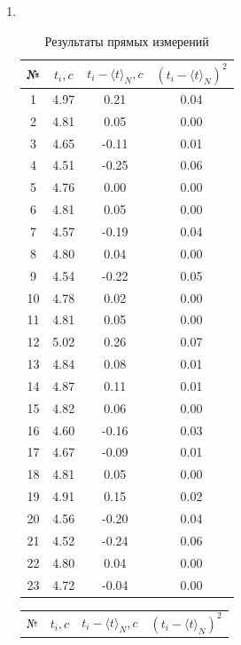 \documentclass[11pt]{article}
\newcommand{\innp}[1]{\langle #1\rangle}
\begin{document}
\begin{enumerate}
	\item ~
		\begin{table}[htb]
		\large
		\centering
		\caption{Результаты прямых измерений}
		\begin{tabular}{|c|c|c|c|}
			\hline
			№ & $t_i, c$ & $t_i - \innp{t}_N, c$ & $(t_i - \innp{t}_N)^2$\\
			\hline
			1 &4.97 & 0.21 & 0.04\\
			\hline
			2 &4.81 & 0.05 & 0.00\\
			\hline
			3 &4.65 & -0.11 & 0.01\\
			\hline
			4 &4.51 & -0.25 & 0.06\\
			\hline
			5 &4.76 & 0.00 & 0.00\\
			\hline
			6 &4.81 & 0.05 & 0.00\\
			\hline
			7 &4.57 & -0.19 & 0.04\\
			\hline
			8 &4.80 & 0.04 & 0.00\\
			\hline
			9 &4.54 & -0.22 & 0.05\\
			\hline
			10 &4.78 & 0.02 & 0.00\\
			\hline
			11 &4.81 & 0.05 & 0.00\\
			\hline
			12 &5.02 & 0.26 & 0.07\\
			\hline
			13 &4.84 & 0.08 & 0.01\\
			\hline
			14 &4.87 & 0.11 & 0.01\\
			\hline
			15 &4.82 & 0.06 & 0.00\\
			\hline
			16 &4.60 & -0.16 & 0.03\\
			\hline
			17 &4.67 & -0.09 & 0.01\\
			\hline
			18 &4.81 & 0.05 & 0.00\\
			\hline
			19 &4.91 & 0.15 & 0.02\\
			\hline
			20 &4.56 & -0.20 & 0.04\\
			\hline
			21 &4.52 & -0.24 & 0.06\\
			\hline
			22 &4.80 & 0.04 & 0.00\\
			\hline
			23 &4.72 & -0.04 & 0.00\\
			\hline
		\end{tabular}
		\end{table}
\pagebreak{}
\begin{table}[htb]
	\large
	\centering
	\begin{tabular}{|c|c|c|c|}
	\hline
	№ & $t_i, c$ & $t_i - \innp{t}_N, c$ & $(t_i - \innp{t}_N)^2$\\

\end{tabular}
\end{table}
\end{enumerate}
\end{document}
